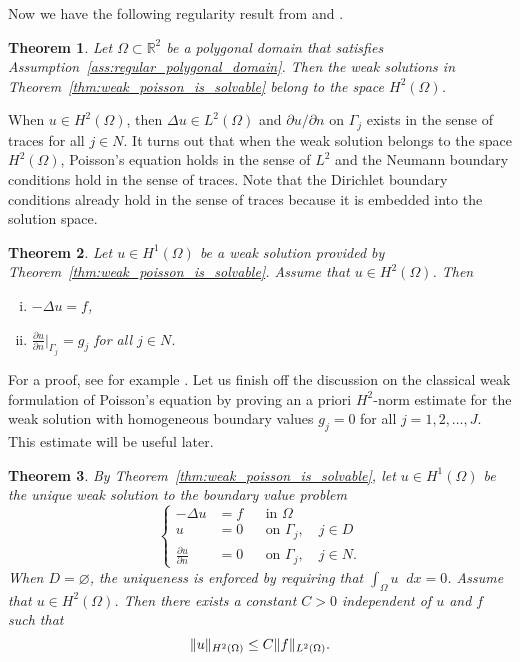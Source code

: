 \documentclass[english, 12pt, a4paper, sci, utf8, a-2b, online]{aaltothesis}
\theoremstyle{definition}
\theoremstyle{plain}
\newtheorem{theorem}{Theorem}[section]
\DeclarePairedDelimiter\norm{\lVert}{\rVert}
\newcommand*\diff{\mathop{}\!d}
\numberwithin{equation}{section}
\begin{document}
Now we have the following regularity result from \cite[Theorem 4.4.4.13 on p.~245]{grisvard2011}
and \cite[Theorem 1]{grisvard1976}.
\begin{theorem}
    \label{thm:H2_regularity}
    Let $\Omega \subset \mathbb{R}^2$ be a polygonal domain that
    satisfies Assumption~\ref{ass:regular_polygonal_domain}.
    Then the weak solutions in Theorem~\ref{thm:weak_poisson_is_solvable}
    belong to the space $H^2(\Omega)$.
\end{theorem}
When $u \in H^2(\Omega)$, then $\Delta u \in L^2(\Omega)$
and $\partial u / \partial n$ on $\Gamma_j$ exists in the sense of traces
for all $j \in N$.
It turns out that when the weak solution belongs
to the space $H^2(\Omega)$, Poisson's equation holds in the sense of $L^2$
and the Neumann boundary conditions hold in the sense of traces.
Note that the Dirichlet boundary conditions already hold in the sense
of traces because it is embedded into the solution space.
\begin{theorem}
    \label{thm:weak_solution_is_strong_solution}
    Let $u \in H^1(\Omega)$ be a weak solution provided by
    Theorem~\ref{thm:weak_poisson_is_solvable}. Assume that $u \in H^2(\Omega)$.
    Then
    \begin{enumerate}[(i)]
        \item $-\Delta u = f$,
        \item $\frac{\partial u}{\partial n}|_{\Gamma_j} = g_j$ for all $j \in N$.
    \end{enumerate}
\end{theorem}
For a proof, see for example
\cite[Proposition 5.1.9 on p.~131]{scottbrenner2007}.
Let us finish off the discussion on the classical weak
formulation of Poisson's equation
by proving an a priori $H^2$-norm estimate for the weak solution
with homogeneous boundary values $g_j = 0$ for all $j=1,2,\dotsc,J$.
This estimate will be useful later.
\begin{theorem}
    \label{thm:a_priori_H2_estimate}
    By Theorem~\ref{thm:weak_poisson_is_solvable},
    let $u \in H^1(\Omega)$ be the unique weak solution
    to the boundary value problem
    \begin{equation*}
        \left\{
            \begin{aligned}
                -\Delta u &= f && \text{in } \Omega \\
                u &= 0 && \text{on } \Gamma_j, \quad j \in D \\
                \frac{\partial u}{\partial n} &= 0 && \text{on } \Gamma_j,
                \quad j \in N.
            \end{aligned}
        \right.
    \end{equation*}
    When $D = \varnothing$, the uniqueness is enforced by requiring
    that $\int_{\Omega} u \diff x = 0$. Assume that $u \in H^2(\Omega)$.
    Then there exists a constant $C > 0$ independent of $u$ and $f$ such that
    \begin{equation*}
        \norm{u}_{H^2(\Omega)} \leq C \norm{f}_{L^2(\Omega)}.
    \end{equation*}
\end{theorem}
\end{document}
